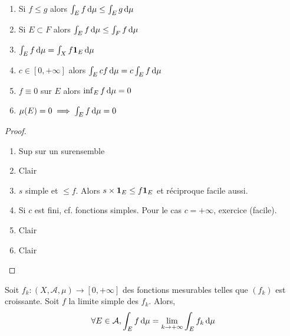 \begin{prop}
\begin{enumerate}
    \item Si $f\leq g$ alors $\int_E f\mathop{}\!\mathrm d \mu\leq \int_Eg\mathop{}\!\mathrm d \mu$
    \item Si $E\subset F$ alors  $\int_E f\mathop{}\!\mathrm d \mu \leq  \int_Ff\mathop{}\!\mathrm d\mu$
    \item $\int_Ef\mathop{}\!\mathrm d \mu=\int_Xf\bm{1}_E\mathop{}\!\mathrm d \mu$
    \item  $c \in  [0, +\infty]$ alors $\int_Ecf\mathop{}\!\mathrm d\mu=c\int_Ef\mathop{}\!\mathrm d\mu$
    \item  $f\equiv 0$ sur  $E$ alors  $\inf_Ef\mathop{}\!\mathrm d \mu=0$
    \item  $\mu(E)=0 \implies \int_Ef\mathop{}\!\mathrm d \mu=0$
\end{enumerate}
\end{prop}

\begin{proof}
\begin{enumerate}
    \item Sup sur un surensemble
    \item Clair
    \item $s$ simple et  $\leq f$. Alors $s\times \bm{1}_E\leq f\bm{1}_E$ et réciproque facile aussi.
    \item Si $c$ est fini, cf. fonctions simples. Pour le cas  $c=+\infty$, exercice (facile). 
    \item Clair
    \item Clair
\end{enumerate}
\end{proof}

\begin{thm}
    Soit $f_k:(X, \mathcal  A, \mu)\longrightarrow [0, +\infty]$ des fonctions mesurables telles que $(f_k)$ est croissante. Soit  $f$ la limite simple des  $f_k$. Alors,  \[
        \forall  E \in  \mathcal  A, \int_Ef\mathop{}\!\mathrm d \mu=\lim_{k\to +\infty}\int_Ef_k\mathop{}\!\mathrm d \mu
    \] 

\end{thm}

